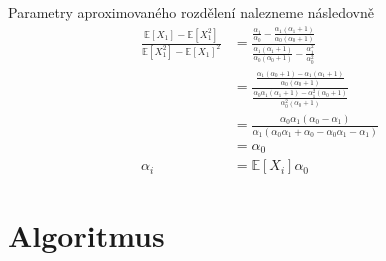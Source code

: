Parametry aproximovaného rozdělení nalezneme následovně
\begin{align}
\frac{\mathbb{E}[X_1] - \mathbb{E}[X_1^2]}
     {\mathbb{E}[X_1^2] - \mathbb{E}[X_1]^2} &=
\frac{
	\frac{\alpha_1}
		{\alpha_0}
	- \frac{\alpha_1(\alpha_1 + 1)}
		{\alpha_0(\alpha_0 + 1)}
	}
	{
	\frac{\alpha_1(\alpha_1 + 1)}
		{\alpha_0(\alpha_0 + 1)}
	- \frac{\alpha_1^2}
		{\alpha_0^2}
	}
\\
&=
\frac{
    \frac{\alpha_1 (\alpha_0 + 1) - \alpha_1(\alpha_1 + 1)}
         {\alpha_0 (\alpha_0 + 1)}
}{
    \frac{\alpha_0 \alpha_1 (\alpha_1 + 1) - \alpha_1^2 (\alpha_0 + 1)}
         {\alpha_0^2 (\alpha_0 + 1)}
}
\\
&=
\frac{\alpha_0 \alpha_1 (\alpha_0 - \alpha_1)}
     {\alpha_1 (\alpha_0 \alpha_1 + \alpha_0 - \alpha_0 \alpha_1 - \alpha_1)}
\\
&=
\alpha_0
\\
\alpha_i &= \mathbb{E}[X_i] \alpha_0
\end{align}

\section{Algoritmus}

